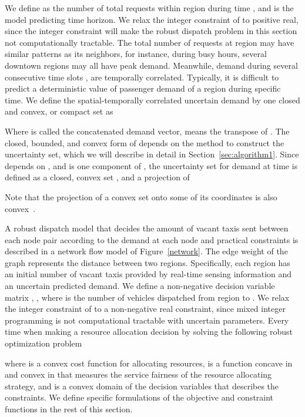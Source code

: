 \documentclass[10pt,twocolumn,twoside,english]{IEEEtran}
\begin{document}
We define  as the number of total requests within region  during time , and  is the model predicting time horizon. We relax the integer constraint of  to positive real, since the integer constraint will make the robust dispatch problem in this section not computationally tractable. The total number of requests at region  may have similar patterns as its neighbors, for instance, during busy hours, several downtown regions may all have peak demand. Meanwhile, demand during several consecutive time slots ,  are temporally correlated. Typically, it is difficult to predict a deterministic value of passenger demand of a region during specific time. We define the spatial-temporally correlated uncertain demand by one closed and convex, or compact set  as
\\\centerline{}               
Where  is called the concatenated demand vector,  means the transpose of . The closed, bounded, and convex form of  depends on the method to construct the uncertainty set, which we will describe in detail in Section~\ref{sec:algorithm1}. Since  depends on , and  is one component of , the uncertainty set for demand  at time  is defined as a closed, convex set , and a projection of 
\\\centerline{}
Note that the projection of a convex set onto some of its coordinates is also convex~\cite[Chapter 2.3.2]{book_convex}. 

A robust dispatch model that decides the amount of vacant taxis sent between each node pair according to the demand at each node and practical constraints is described in a network flow model of Figure~\ref{network}. The edge weight of the graph represents the distance between two regions. Specifically, each region has an initial number of vacant taxis provided by real-time sensing information and an uncertain predicted demand. We define a non-negative decision variable matrix ,  , where  is the number of vehicles dispatched from region  to . We relax the integer constraint of  to a non-negative real constraint, since mixed integer programming is not computational tractable with uncertain parameters. Every time when making a resource allocation decision by solving the following robust optimization problem

where  is a convex cost function for allocating resources,  is a function concave in  and convex in  that measures the service fairness of the resource allocating strategy, and  is a convex domain of the decision variables that describes the constraints. We define specific formulations of the objective and constraint functions in the rest of this section. 
\end{document}

